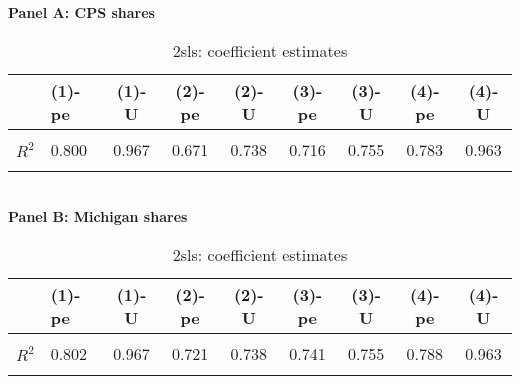 \begin{table}[!htbp] \centering
\caption{2sls: coefficient estimates}
\label{tab:models}
\textbf{Panel A: CPS shares} \\ 
\begin{tabular}[t]{>{}llccccccc}
\toprule
  & (1)-pe & (1)-U & (2)-pe & (2)-U & (3)-pe & (3)-U & (4)-pe & (4)-U\\
\midrule
\textbf{\cellcolor{gray!10}{Coef.}} & \cellcolor{gray!10}{0.435} & \cellcolor{gray!10}{0.579} & \cellcolor{gray!10}{1.347} & \cellcolor{gray!10}{0.514} & \cellcolor{gray!10}{1.496} & \cellcolor{gray!10}{0.446} & \cellcolor{gray!10}{0.259} & \cellcolor{gray!10}{0.779}\\
\textbf{$R^2$} & 0.800 & 0.967 & 0.671 & 0.738 & 0.716 & 0.755 & 0.783 & 0.963\\
\textbf{\cellcolor{gray!10}{F (1st stage)}} & \cellcolor{gray!10}{18.159} & \cellcolor{gray!10}{296.293} & \cellcolor{gray!10}{360.049} & \cellcolor{gray!10}{305.673} & \cellcolor{gray!10}{459.411} & \cellcolor{gray!10}{218.610} & \cellcolor{gray!10}{8.002} & \cellcolor{gray!10}{907.186}\\
\bottomrule
\end{tabular} \vspace{5mm} 
\\ \textbf{Panel B: Michigan shares} \\ 
\begin{tabular}[t]{>{}llccccccc}
\toprule
  & (1)-pe & (1)-U & (2)-pe & (2)-U & (3)-pe & (3)-U & (4)-pe & (4)-U\\
\midrule
\textbf{\cellcolor{gray!10}{Coef.}} & \cellcolor{gray!10}{0.243} & \cellcolor{gray!10}{0.579} & \cellcolor{gray!10}{0.753} & \cellcolor{gray!10}{0.514} & \cellcolor{gray!10}{0.744} & \cellcolor{gray!10}{0.446} & \cellcolor{gray!10}{0.228} & \cellcolor{gray!10}{0.779}\\
\textbf{$R^2$} & 0.802 & 0.967 & 0.721 & 0.738 & 0.741 & 0.755 & 0.788 & 0.963\\
\textbf{\cellcolor{gray!10}{F (1st stage)}} & \cellcolor{gray!10}{25.532} & \cellcolor{gray!10}{296.293} & \cellcolor{gray!10}{549.088} & \cellcolor{gray!10}{305.673} & \cellcolor{gray!10}{570.632} & \cellcolor{gray!10}{218.610} & \cellcolor{gray!10}{22.876} & \cellcolor{gray!10}{907.186}\\
\bottomrule
\end{tabular}\end{table}

